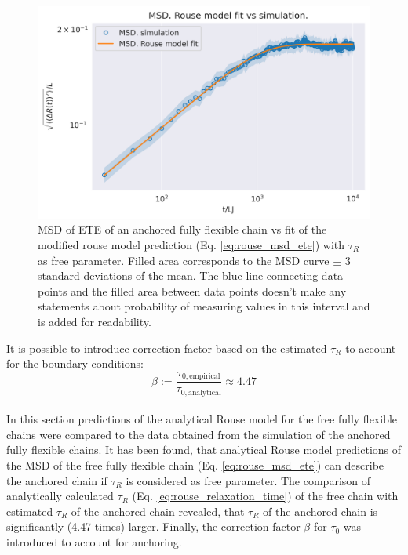 \documentclass[
    paper=A4,pagesize=automedia,fontsize=12pt,
    BCOR=15mm,DIV=22,
    twoside,headinclude,footinclude=false,
    fleqn,             %
    bibliography=totocnumbered,          %
    listof=totoc,                %
    listof=flat,                 %
    cleardoublepage=empty      %
    numbers=endperiod
]{scrartcl}
\begin{document}
\begin{figure}[h]
    \begin{center}
      \includegraphics[width=\columnwidth,trim={0cm 0cm 0cm 0.8cm},clip]{3-exp-free-param-log.png}
      \caption{\label{fig:anchored_flex_chain_vs_rouse_fitted}
      MSD of ETE of an anchored fully flexible chain vs fit of the modified 
      rouse model prediction 
      (Eq. \ref{eq:rouse_msd_ete}) with $\tau_R$ as free parameter.
      Filled area corresponds to the MSD curve $\pm$ 
      3 standard deviations of the mean. The
      blue line connecting data points and the filled area between data points doesn't make
      any statements about probability of measuring values in this interval and is
      added for readability.
      }
    \end{center}
\end{figure}

It is possible to introduce correction factor based on the estimated $\tau_R$
to account for the boundary conditions:
\begin{equation}
    \label{eq:adj_factor_beta}
    \beta := \frac{\tau_{0, \textrm{empirical}}}{\tau_{0, \textrm{analytical}}} \approx 4.47
\end{equation}
\\
In this section predictions of the analytical Rouse model for 
the free fully flexible chains were compared to the data obtained 
from the simulation of the anchored fully flexible chains.
It has been found, that analytical Rouse model predictions of the MSD of the 
free fully flexible chain (Eq. \ref{eq:rouse_msd_ete}) can describe the 
anchored chain if $\tau_R$ is considered as free parameter. The comparison of 
analytically calculated $\tau_R$ (Eq. \ref{eq:rouse_relaxation_time}) of the free chain
with estimated $\tau_R$ of the anchored chain revealed, that 
$\tau_R$ of the anchored chain is significantly (4.47 times) larger. Finally, the
correction factor $\beta$ for $\tau_0$ was introduced to account for anchoring.
\end{document}
